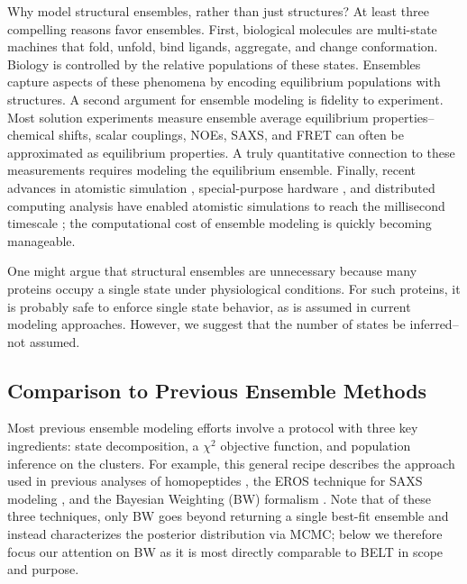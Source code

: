 \documentclass[journal=jacsat,manuscript=article]{achemso}
\begin{document}
Why model structural ensembles, rather than just structures?  At least three compelling reasons favor ensembles.  First, biological molecules are multi-state machines that fold, unfold, bind ligands, aggregate, and change conformation.  Biology is controlled by the relative populations of these states.  Ensembles capture aspects of these phenomena by encoding equilibrium populations with structures.  A second argument for ensemble modeling is fidelity to experiment.  Most solution experiments measure ensemble average equilibrium properties--chemical shifts, scalar couplings, NOEs, SAXS, and FRET can often be approximated as equilibrium properties.  A truly quantitative connection to these measurements requires modeling the equilibrium ensemble.  Finally, recent advances in atomistic simulation  \cite{hess2008, pronk2013gromacs, eastman2012openmm, eastman2010openmm}, special-purpose hardware  \cite{Shaw2008}, and distributed computing analysis  \cite{emma, msmb2} have enabled atomistic simulations to 
reach the millisecond timescale  \cite{voelz2010, bowman2011atomistic, shaw2010, Shaw2011}; the computational cost of ensemble modeling is quickly becoming manageable.

One might argue that structural ensembles are unnecessary because many proteins occupy a single state under physiological conditions.  For such proteins, it is probably safe to enforce single state behavior, as is assumed in current modeling approaches. However, we suggest that the number of states be inferred--not assumed.  

\subsection*{Comparison to Previous Ensemble Methods}

Most previous ensemble modeling efforts involve a protocol with three key ingredients: state decomposition, a $\chi^2$ objective function, and population inference on the clusters.  For example, this general recipe describes the approach used in previous analyses of homopeptides  \cite{Graf2007}, the EROS technique for SAXS modeling  \cite{rozycki2011saxs}, and the Bayesian Weighting (BW) formalism  \cite{fisher2010}.  Note that of these three techniques, only BW goes beyond returning a single best-fit ensemble and instead characterizes the posterior distribution via MCMC; below we therefore focus our attention on BW as it is most directly comparable to BELT in scope and purpose.
\end{document}
